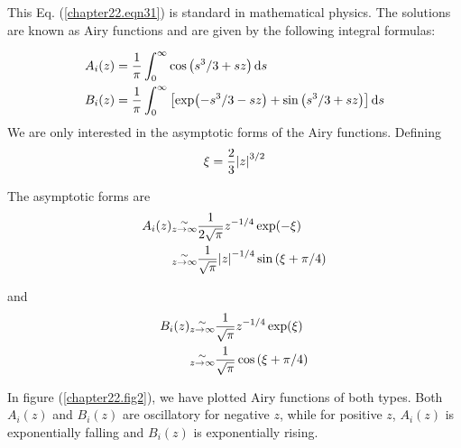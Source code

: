 This Eq. (\ref{chapter22.eqn31}) is standard in mathematical physics. The solutions are known as Airy functions and are given by the following integral formulas:

\begin{align}
\label{chapter22.eqn32}
	A_i(z) &= \frac{1}{\pi} \int_{0}^{\infty} \cos \qty(s^3/3 + s z) \dd{s} \\
\label{chapter22.eqn33}
	B_i(z) &= \frac{1}{\pi} \int_{0}^{\infty} \left[ \exp(-s^3/3 - s z) + \sin\qty(s^3/3 + s z) \right] \dd{s}
\end{align}
We are only interested in the asymptotic forms of the Airy functions. Defining
\begin{equation}
	\xi = \frac{2}{3} \abs{z}^{3/2}
\end{equation}

The asymptotic forms are
\begin{align}
A_i(z) &\substack{\sim \\ z \rightarrow \infty} \frac{1}{2 \sqrt{\pi}} z^{-1/4} \exp(-\xi) \nonumber \\
&\substack{\sim \\ z \rightarrow \infty} \frac{1}{\sqrt{\pi}} \abs{z}^{-1/4} \sin\qty(\xi + \pi / 4)
\label{chapter22.eqn34}
\end{align}

and 
\begin{align}
B_i(z) &\substack{\sim \\ z \rightarrow \infty} \frac{1}{\sqrt{\pi}} z^{-1/4} \exp(\xi) \nonumber \\
&\substack{\sim \\ z \rightarrow \infty} \frac{1}{\sqrt{\pi}} \cos\qty(\xi + \pi / 4)
\label{chapter22.eqn35}
\end{align}

In figure (\ref{chapter22.fig2}), we have plotted Airy functions of both types. Both $A_i(z)$ and $B_i(z)$ are oscillatory for negative $z$, while for positive $z$, $A_i(z)$ is exponentially falling and $B_i(z)$ is exponentially rising.

